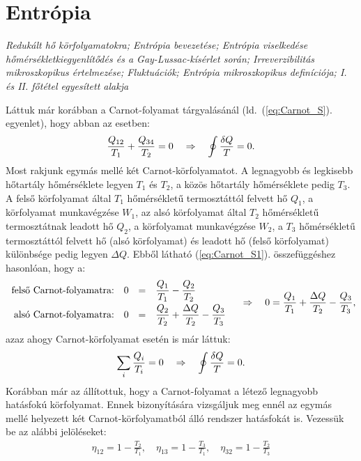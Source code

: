 \section{Entrópia}
\emph{Redukált hő körfolyamatokra; Entrópia bevezetése; Entrópia viselkedése hőmérsékletkiegyenlítődés és a Gay-Lussac-kísérlet során; Irreverzibilitás mikroszkopikus értelmezése; Fluktuációk; Entrópia mikroszkopikus definíciója; I. és II. főtétel egyesített alakja}

Láttuk már korábban a Carnot-folyamat tárgyalásánál (ld.\ (\ref{eq:Carnot_S}). egyenlet), hogy abban az esetben:
\begin{align}\label{eq:Carnot_S1}
	\frac{Q_{12}}{T_1}+\frac{Q_{34}}{T_2} = 0 \quad\Rightarrow\quad \oint \frac{\delta Q}{T} = 0.
\end{align}
Most rakjunk egymás mellé két Carnot-körfolyamatot. A legnagyobb és legkisebb hőtartály hőmérséklete legyen $T_1$ és $T_2$, a közös hőtartály hőmérséklete pedig $T_3$. A felső körfolyamat által $T_1$ hőmérsékletű termosztáttól felvett hő $Q_1$, a körfolyamat munkavégzése $W_1$, az alsó körfolyamat által $T_2$ hőmérsékletű termosztátnak leadott hő $Q_2$, a körfolyamat munkavégzése $W_2$, a $T_3$ hőmérsékletű termosztáttól felvett hő (alsó körfolyamat) és leadott hő (felső körfolyamat) különbsége pedig legyen $\Delta Q$. Ebből látható (\ref{eq:Carnot_S1}). összefüggéshez hasonlóan, hogy a:
\begin{align}
	\begin{array}{rrcl}
{\tn{felső Carnot-folyamatra:}}&0&=&\dfrac{Q_1}{T_1}-\dfrac{Q_2}{T_2}\vspace{1mm}\\
{\tn{alsó Carnot-folyamatra:}}&0&=&\dfrac{Q_2}{T_2}+\dfrac{\Delta Q}{T_2}-\dfrac{Q_3}{T_3}\\
\end{array}
\follows
0 = \frac{Q_1}{T_1}+\frac{\Delta Q}{T_2}-\frac{Q_3}{T_3},
\end{align} 
azaz ahogy Carnot-körfolyamat esetén is már láttuk:
\begin{align}
	\sum_i \frac{Q_i}{T_i}=0 \quad\Rightarrow\quad \oint\frac{\delta Q}{T} = 0.
\end{align}
Korábban már az állítottuk, hogy a Carnot-folyamat a létező legnagyobb hatásfokú körfolyamat. Ennek bizonyítására vizsgáljuk meg ennél az egymás mellé helyezett két Carnot-körfolyamatból álló rendszer hatásfokát is. Vezessük be az alábbi jelöléseket:
\begin{align}
	\eta_{12}=1-\frac{T_2}{T_1},\quad \eta_{13}=1-\frac{T_3}{T_1},\quad \eta_{32}=1-\frac{T_2}{T_3}
\end{align}
